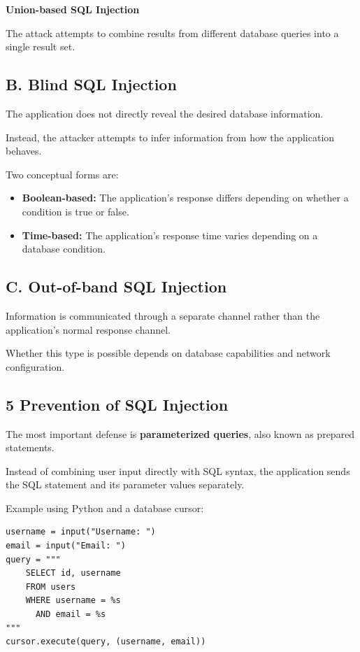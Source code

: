 \textbf{Union-based SQL Injection}

The attack attempts to combine results from different database queries into a single result set.

\subsection{B. Blind SQL Injection}

The application does not directly reveal the desired database information.

Instead, the attacker attempts to infer information from how the application behaves.

Two conceptual forms are:

\begin{itemize}
\item \textbf{Boolean-based:} The application's response differs depending on whether a condition is true or false.
\item \textbf{Time-based:} The application's response time varies depending on a database condition.
\end{itemize}

\subsection{C. Out-of-band SQL Injection}

Information is communicated through a separate channel rather than the application's normal response channel.

Whether this type is possible depends on database capabilities and network configuration.

\subsection{5 Prevention of SQL Injection}

The most important defense is \textbf{parameterized queries}, also known as prepared statements.

Instead of combining user input directly with SQL syntax, the application sends the SQL statement and its parameter values separately.

Example using Python and a database cursor:

\begin{lstlisting}
username = input("Username: ")
email = input("Email: ")
query = """
    SELECT id, username
    FROM users
    WHERE username = %s
      AND email = %s
"""
cursor.execute(query, (username, email))
\end{lstlisting}

